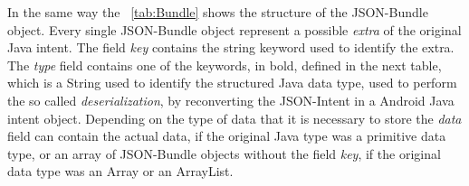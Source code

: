 In the same way the \tablename~\ref{tab:Bundle} shows the structure of the JSON-Bundle object. Every single JSON-Bundle object represent a possible \textit{extra} of the original Java intent. The field \textit{key} contains the string keyword used to identify the extra. The \textit{type} field contains one of the keywords, in bold, defined in the next table, which is a String used to identify the structured Java data type, used to perform the so called \textit{deserialization}, by reconverting the JSON-Intent in a Android Java intent object. Depending on the type of data that it is necessary to store the \textit{data} field can contain the actual data, if the original Java type was a primitive data type, or an array of JSON-Bundle objects without the field \textit{key}, if the original data type was an Array or an ArrayList.\\

	

